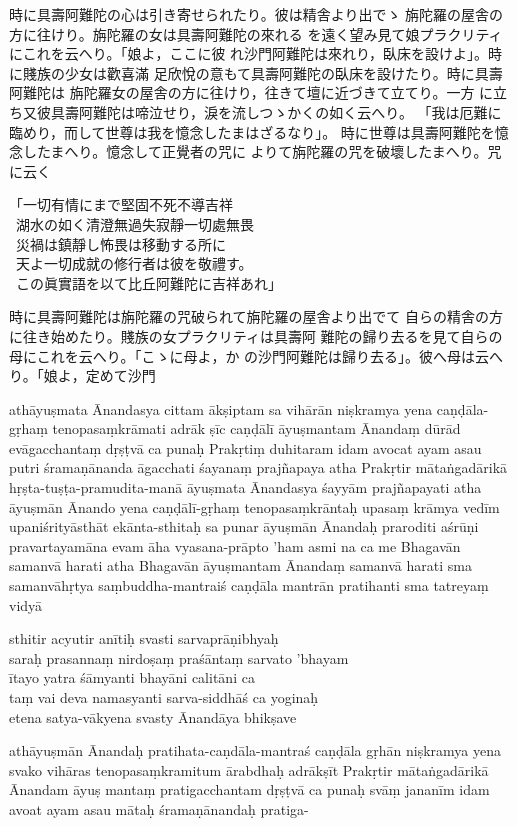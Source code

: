 \newpage
時に具壽阿難陀の心は引き寄せられたり。彼は精舎より出でゝ
旃陀羅の屋舎の方に往けり。旃陀羅の女は具壽阿難陀の來れる
を遠く望み見て娘プラクリティにこれを云へり。「娘よ，ここに彼
れ沙門阿難陀は來れり，臥床を設けよ」。時に賤族の少女は歡喜滿
足欣悅の意もて具壽阿難陀の臥床を設けたり。時に具壽阿難陀は
旃陀羅女の屋舎の方に往けり，往きて壇に近づきて立てり。一方
に立ち又彼具壽阿難陀は啼泣せり，淚を流しつゝかくの如く云へり。
「我は厄難に臨めり，而して世尊は我を憶念したまはざるなり」。
時に世尊は具壽阿難陀を憶念したまへり。憶念して正覺者の咒に
よりて旃陀羅の咒を破壞したまへり。咒に云く
\begin{addmargin}[2em]{0em}
「一切有情にまで堅固不死不導吉祥\\
\ 湖水の如く清澄無過失寂靜一切處無畏\\
\ 災禍は鎮靜し怖畏は移動する所に\\
\ 天よ一切成就の修行者は彼を敬禮す。\\
\ この眞實語を以て比丘阿難陀に吉祥あれ」
\end{addmargin}
時に具壽阿難陀は旃陀羅の咒破られて旃陀羅の屋舎より出でて
自らの精舎の方に往き始めたり。賤族の女プラクリティは具壽阿
難陀の歸り去るを見て自らの母にこれを云へり。「こゝに母よ，か
の沙門阿難陀は歸り去る」。彼へ母は云へり。「娘よ，定めて沙門

\newpage
athāyuṣmata Ānandasya cittam ākṣiptam \da{} sa vihārān
niṣkramya yena caṇḍāla-gṛhaṃ tenopasaṃkrāmati \da{} adrāk\-%
ṣīc caṇḍālī āyuṣmantam Ānandaṃ dūrād evāgacchantaṃ
dṛṣṭvā ca punaḥ Prakṛtiṃ duhitaram idam avocat \da{} ayam
asau putri śramaṇānanda āgacchati śayanaṃ prajñapaya \da{}
atha Prakṛtir mātaṅgadārikā hṛṣta-tuṣṭa-pramudita-manā
āyuṣmata Ānandasya śayyām prajñapayati \da{} atha āyuṣmān
Ānando yena caṇḍālī-gṛhaṃ tenopasaṃkrāntaḥ \da{} upasaṃ\-%
krāmya vedīm upaniśrityāsthāt \da{} ekānta-sthitaḥ sa punar
āyuṣmān Ānandaḥ praroditi aśrūṇi pravartayamāna evam
āha \da{} vyasana-prāpto 'ham asmi na ca me Bhagavān samanvā\-%
harati \da{} atha Bhagavān āyuṣmantam Ānandaṃ samanvā\-%
harati sma samanvāhṛtya saṃbuddha-mantraiś caṇḍāla\-%
mantrān pratihanti sma \da{} tatreyaṃ vidyā
\begin{addmargin}[2em]{0em}
sthitir acyutir anītiḥ svasti sarvaprāṇibhyaḥ \da{}\\
saraḥ prasannaṃ nirdoṣaṃ praśāntaṃ sarvato 'bhayam \da{}\\
ītayo yatra śāmyanti bhayāni calitāni ca \dd{}\\
taṃ vai deva namasyanti sarva-siddhāś ca yoginaḥ \da{}\\
etena satya-vākyena svasty Ānandāya bhikṣave \dd{}
\end{addmargin}
athāyuṣmān Ānandaḥ pratihata-caṇdāla-mantraś caṇḍāla\-%
gṛhān niṣkramya yena svako vihāras tenopasaṃkramitum
ārabdhaḥ \da{} adrākṣīt Prakṛtir mātaṅgadārikā Ānandam āyuṣ\-%
mantaṃ pratigacchantam dṛṣṭvā ca punaḥ svāṃ jananīm
idam avoat \da{} ayam asau mātaḥ śramaṇānandaḥ pratiga-

